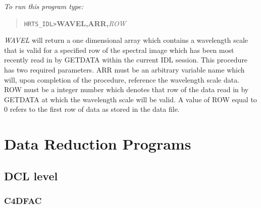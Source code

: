{\em To run this program type:}
\begin{quote}
{\tt HRTS\_IDL>}{\bf WAVEL,ARR,}{\it ROW}               
\end{quote}
{\em WAVEL} will return a one dimensional array which contains a
   wavelength scale that is valid for a specified row of the spectral
   image which has been most recently read in by GETDATA within the
   current IDL session.  This procedure has two required parameters.  ARR
   must be an arbitrary variable name which will, upon completion of the
   procedure, reference the wavelength scale data.  ROW must be a integer
   number which denotes that row of the data read in by GETDATA at which
   the wavelength scale will be valid.  A value of ROW equal to 0 refers
   to the first row of data as stored in the data file.
\newpage

\section{Data Reduction Programs}

\subsection{DCL level}

\subsubsection{C4DFAC}

